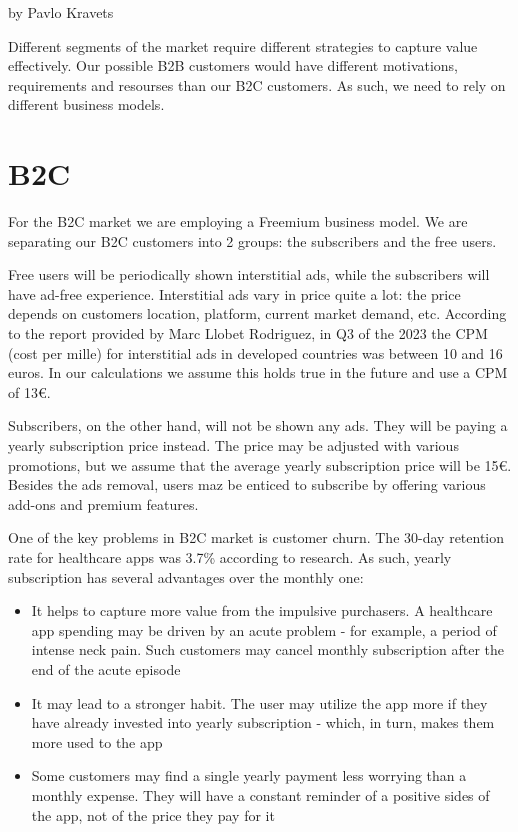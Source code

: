 by Pavlo Kravets


Different segments of the market require different strategies to capture value effectively. Our possible B2B customers would have different motivations, requirements and resourses than our B2C customers. As such, we need to rely on different business models. 

\section{B2C}

For the B2C market we are employing a Freemium business model. We are separating our B2C customers into 2 groups: the subscribers and the free users.

Free users will be periodically shown interstitial ads, while the subscribers will have ad-free experience. Interstitial ads vary in price quite a lot: the price depends on customers location, platform, current market demand, etc. According to the report provided by Marc Llobet Rodriguez\cite{ECPM}, in Q3 of the 2023 the CPM (cost per mille) for interstitial ads in developed countries was between 10 and 16 euros. In our calculations we assume this holds true in the future and use a CPM of 13€. 

Subscribers, on the other hand, will not be shown any ads. They will be paying a yearly subscription price instead. The price may be adjusted with various promotions, but we assume that the average yearly subscription price will be 15€. Besides the ads removal, users maz be enticed to subscribe by offering various add-ons and premium features.

One of the key problems in B2C market is customer churn. The 30-day retention rate for healthcare apps was 3.7\% according to research\cite{churn}. As such, yearly subscription has several advantages over the monthly one:
\begin{itemize}
    \item It helps to capture more value from the impulsive purchasers. A healthcare app spending may be driven by an acute problem - for example, a period of intense neck pain. Such customers may cancel monthly subscription after the end of the acute episode
    \item It may lead to a stronger habit. The user may utilize the app more if they have already invested into yearly subscription - which, in turn, makes them more used to the app
    \item Some customers may find a single yearly payment less worrying than a monthly expense. They will have a constant reminder of a positive sides of the app, not of the price they pay for it 
\end{itemize} 

